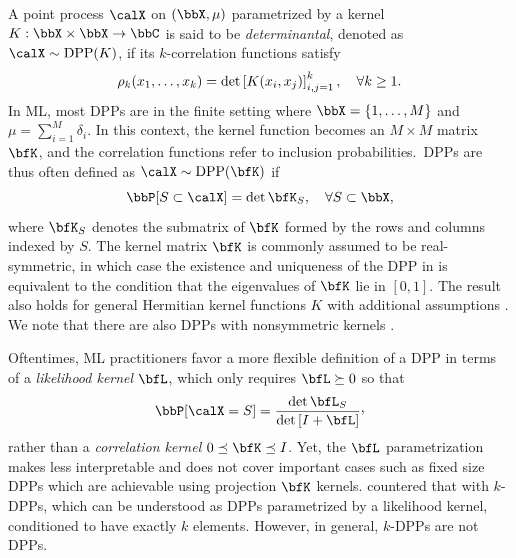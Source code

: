 \documentclass[twoside,11pt]{article}
\begin{document}

        A point process $\calX$ on $(\bbX,\mu)$ parametrized by a kernel $K:\bbX\times \bbX\rightarrow \bbC$ is said to be \emph{determinantal}, denoted as $\calX\sim\DPP(K)$, if its $k$-correlation functions satisfy
        \begin{equation*}
            \label{eq:k-correlation_function_DPP}
            \rho_k(x_1,\dots,x_k)
              = \det \left[ K(x_i, x_j) \right]_{i,j=1}^k,
            \quad \forall k\geq 1.
        \end{equation*}
        In ML, most DPPs are in the finite setting where $\bbX = \lrcb{1,\dots,M}$ and $\mu=\sum_{i=1}^M \delta_i$.
        In this context, the kernel function becomes an $M\times M$ matrix $\bfK$, and the correlation functions refer to inclusion probabilities.~DPPs are thus often defined as $\calX\sim \DPP(\bfK)$ if
        \begin{equation}
        \label{eq:inclusion_proba_finite}
            \Proba{S \subset \calX} = \det \bfK_S,
                \quad\forall S\subset \bbX,
        \end{equation}
        where ${\bfK}_S$ denotes the submatrix of $\bfK$ formed by the rows and columns indexed by $S$.
        The kernel matrix $\bfK$ is commonly assumed to be real-symmetric, in which case the existence and uniqueness of the DPP in  is equivalent to the condition that the eigenvalues of $\bfK$ lie in $[0,1]$.
        The result also holds for general Hermitian kernel functions $K$ with additional assumptions \cite[Theorem\,3]{Sos00}.
        We note that there are also DPPs with nonsymmetric kernels \citep{BoDiFu10,GBDK19}.

        Oftentimes, ML practitioners favor a more flexible definition of a DPP in terms of a \emph{likelihood kernel} $\bfL$, which only requires $\bfL\succeq 0$ so that
        \begin{equation*}
            \Proba{\calX=S} = \frac{\det \bfL_S}{\det \lrb{I + \bfL}}\CommaBin
        \end{equation*}
        rather than a \emph{correlation kernel} $0\preceq \bfK \preceq I$.
        Yet, the $\bfL$ parametrization makes  less interpretable and does not cover important cases such as fixed size DPPs which are achievable using projection $\bfK$ kernels.
        \citet[][Section\,5]{KuTa12} countered that with $k$-DPPs, which can be understood as DPPs parametrized by a likelihood kernel, conditioned to have exactly $k$ elements.
        However, in general, $k$-DPPs are not DPPs.
\end{document}

